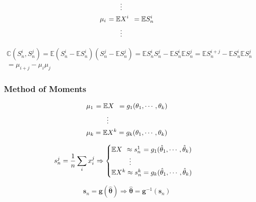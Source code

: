 \documentclass[12pt, twoside, draft]{article}
\begin{document}
\begin{align}
&\hspace{30pt} \vdots \notag\\
&\mu_i \hspace{1pt} = \mathbb{E}X^i \hspace{5pt} = \mathbb{E}S^i_n \\
&\hspace{30pt} \vdots \notag
\end{align}

\begin{multline}
\mathbb{C}(S^i_n, S^j_n) = \mathbb{E}(S^i_n - \mathbb{E}S^i_n)(S^j_n - \mathbb{E}S^j_n) = \mathbb{E}S^i_n S^j_n - \mathbb{E}S^i_n \mathbb{E}S^j_n = \mathbb{E}S^{i+j}_n  - \mathbb{E}S^i_n \mathbb{E}S^j_n \\
 = \mu_{i+j} - \mu_i \mu_j
\end{multline}

\subsubsection{Method of Moments}\label{sec:method_of_moments}


\begin{align}
&\mu_1 \hspace{1pt} = \mathbb{E}X \hspace{5pt} = g_1(\theta_1, \cdots, \theta_k) \notag \\
&\hspace{30pt} \vdots \notag \\
&\mu_k = \mathbb{E}X^k = g_k(\theta_1, \cdots, \theta_k)
\end{align}

\begin{equation}
s^j_n = \frac{1}{n}\sum_i x^j_i \Rightarrow
\begin{cases}
\mathbb{E}X \hspace{4pt} \approx s^1_n \hspace{1pt}  = g_1(\hat{\theta}_1, \cdots, \hat{\theta}_k) \notag \\
\hspace{26pt} \vdots \notag \\
\mathbb{E}X^k \approx s^k_n = g_k(\hat{\theta}_1, \cdots, \hat{\theta}_k)
\end{cases}
\end{equation}

\begin{equation}
\mathbf{s}_n = \mathbf{g}(\hat{\boldsymbol{\theta}}) \Rightarrow \hat{\boldsymbol{\theta}} = \mathbf{g}^{-1}(\mathbf{s}_n)
\end{equation}
\end{document}
